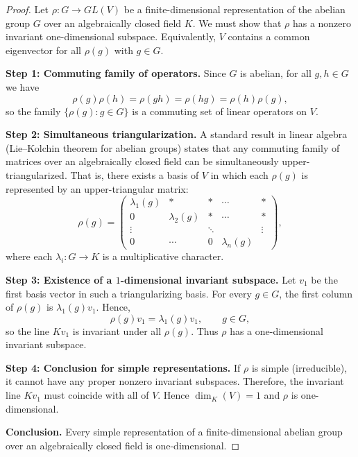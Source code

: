 \begin{proof}
Let $\rho:G\to GL(V)$ be a finite-dimensional representation of the abelian group $G$
over an algebraically closed field $K$.
We must show that $\rho$ has a nonzero invariant one-dimensional subspace.
Equivalently, $V$ contains a common eigenvector for all $\rho(g)$ with $g\in G$.

\smallskip
\noindent\textbf{Step 1: Commuting family of operators.}
Since $G$ is abelian, for all $g,h\in G$ we have
\[
\rho(g)\rho(h)=\rho(gh)=\rho(hg)=\rho(h)\rho(g),
\]
so the family $\{\rho(g):g\in G\}$ is a commuting set of linear operators on $V$.

\smallskip
\noindent\textbf{Step 2: Simultaneous triangularization.}
A standard result in linear algebra (Lie–Kolchin theorem for abelian groups)
states that any commuting family of matrices over an algebraically closed field
can be simultaneously upper-triangularized.
That is, there exists a basis of $V$ in which each $\rho(g)$ is represented by an upper-triangular matrix:
\[
\rho(g)=
\begin{pmatrix}
\lambda_1(g) & * & * & \cdots & *\\
0 & \lambda_2(g) & * & \cdots & *\\
\vdots & & \ddots & & \vdots\\
0 & \cdots & 0 & \lambda_n(g)
\end{pmatrix},
\]
where each $\lambda_i:G\to K$ is a multiplicative character.

\smallskip
\noindent\textbf{Step 3: Existence of a $1$-dimensional invariant subspace.}
Let $v_1$ be the first basis vector in such a triangularizing basis.
For every $g\in G$, the first column of $\rho(g)$ is $\lambda_1(g)v_1$.
Hence,
\[
\rho(g)v_1 = \lambda_1(g)v_1, \qquad g\in G,
\]
so the line $Kv_1$ is invariant under all $\rho(g)$.
Thus $\rho$ has a one-dimensional invariant subspace.

\smallskip
\noindent\textbf{Step 4: Conclusion for simple representations.}
If $\rho$ is simple (irreducible), it cannot have any proper nonzero invariant subspaces.
Therefore, the invariant line $Kv_1$ must coincide with all of $V$.
Hence $\dim_K(V)=1$ and $\rho$ is one-dimensional.

\smallskip
\noindent\textbf{Conclusion.}
Every simple representation of a finite-dimensional abelian group over an algebraically closed field is one-dimensional.
\end{proof}

